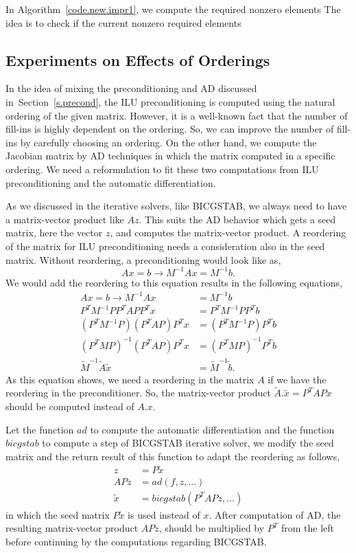 \documentclass[11pt, twoside,a4paper]{book}
\newcommand{\secref}[1]{Section~\protect\ref{#1}}
\newcommand{\coderef}[1]{Algorithm~\protect\ref{#1}}
\begin{document}
In \coderef{code.new.impr1}, we compute the required nonzero elements
The idea is to check if the current nonzero required elements

\subsection{Experiments on Effects of Orderings}
\label{s.ilu}
In the idea of mixing the preconditioning and AD discussed in~\secref{s.precond},
the ILU preconditioning is computed using the natural ordering of the given matrix. However,
it is a well-known fact that the number of fill-ins is highly dependent on the ordering.
So, we can improve the number of fill-ins by carefully choosing an ordering.
On the other hand, we compute the Jacobian matrix by AD techniques in which
the matrix computed in a specific ordering. We need a reformulation to
fit these two computations from ILU preconditioning and the automatic differentiation.

As we discussed in the iterative solvers, like BICGSTAB,
we always need to have a matrix-vector product like $Az$.
This suits the AD behavior which gets a seed matrix, here the vector $z$, and
computes the matrix-vector product.
A reordering of the matrix for ILU preconditioning
needs a consideration also in the seed matrix.
Without reordering, a preconditioning would look like as,
$$
Ax = b \rightarrow M^{-1} Ax = M^{-1}b.
$$
We would add the reordering to this equation results in the following equations,
\begin{align*}
Ax = b \rightarrow M^{-1} Ax &= M^{-1}b\\
P^T M^{-1} P P^T A P P^T x &= P^T M^{-1} P P^T b\\
(P^T M^{-1} P) (P^T A P) P^T x &= (P^T M^{-1} P) P^T b\\
(P^T M P)^{-1} (P^T A P) P^T x &= (P^T M P)^{-1} P^T b\\
\tilde{M}^{-1}\tilde{A}\tilde{x} &= \tilde{M}^{-1}\tilde{b}.
\end{align*}
As this equation shows, we need a reordering in the matrix $A$ if we
have the reordering in the preconditioner.
So, the matrix-vector product $\tilde{A}.\tilde{x} = P^T A P x$
should be computed instead of $A.x$.

Let the function $ad$ to compute the automatic differentiation
and the function $bicgstab$ to compute a step of BICGSTAB iterative solver,
we modify the seed matrix and the return result of this function
to adapt the reordering as follows,
\begin{align*}
z &= P \tilde{x}\\
APz &= ad(f,z,...)\\
\tilde{x} &= bicgstab(P^T APz,...)
\end{align*}
in which the seed matrix $P \tilde{x}$ is used instead of $x$.
After computation of AD, the resulting matrix-vector product $APz$,
should be multiplied by $P^T$ from the left before continuing by the
computations regarding BICGSTAB.
\end{document}
